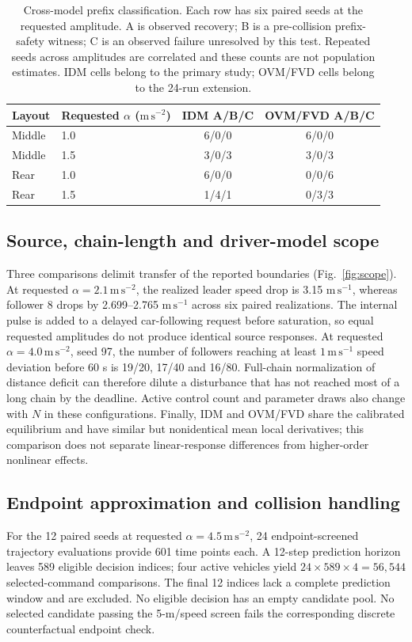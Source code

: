 \documentclass[11pt]{article}
\begin{document}
\begin{table}[H]\centering
\caption{Cross-model prefix classification. Each row has six paired seeds at the requested amplitude. A is observed recovery; B is a pre-collision prefix-safety witness; C is an observed failure unresolved by this test. Repeated seeds across amplitudes are correlated and these counts are not population estimates. IDM cells belong to the primary study; OVM/FVD cells belong to the 24-run extension.}
\label{tab:ovm}
\begin{tabular}{llcc}\toprule
Layout & Requested $\alpha$ ($\mathrm{m\,s^{-2}}$) & IDM A/B/C & OVM/FVD A/B/C\\\midrule
Middle & 1.0 & 6/0/0 & 6/0/0\\
Middle & 1.5 & 3/0/3 & 3/0/3\\
Rear & 1.0 & 6/0/0 & 0/0/6\\
Rear & 1.5 & 1/4/1 & 0/3/3\\\bottomrule
\end{tabular}
\end{table}

\subsection*{Source, chain-length and driver-model scope}
Three comparisons delimit transfer of the reported boundaries (Fig.~\ref{fig:scope}). At requested $\alpha=2.1\,\mathrm{m\,s^{-2}}$, the realized leader speed drop is 3.15 $\mathrm{m\,s^{-1}}$, whereas follower 8 drops by 2.699--2.765 $\mathrm{m\,s^{-1}}$ across six paired realizations. The internal pulse is added to a delayed car-following request before saturation, so equal requested amplitudes do not produce identical source responses. At requested $\alpha=4.0\,\mathrm{m\,s^{-2}}$, seed 97, the number of followers reaching at least $1\,\mathrm{m\,s^{-1}}$ speed deviation before 60 s is 19/20, 17/40 and 16/80. Full-chain normalization of distance deficit can therefore dilute a disturbance that has not reached most of a long chain by the deadline. Active control count and parameter draws also change with $N$ in these configurations. Finally, IDM and OVM/FVD share the calibrated equilibrium and have similar but nonidentical mean local derivatives; this comparison does not separate linear-response differences from higher-order nonlinear effects.

\subsection*{Endpoint approximation and collision handling}
For the 12 paired seeds at requested $\alpha=4.5\,\mathrm{m\,s^{-2}}$, 24 endpoint-screened trajectory evaluations provide 601 time points each. A 12-step prediction horizon leaves 589 eligible decision indices; four active vehicles yield $24\times589\times4=56{,}544$ selected-command comparisons. The final 12 indices lack a complete prediction window and are excluded. No eligible decision has an empty candidate pool. No selected candidate passing the 5-m/speed screen fails the corresponding discrete counterfactual endpoint check.
\end{document}
